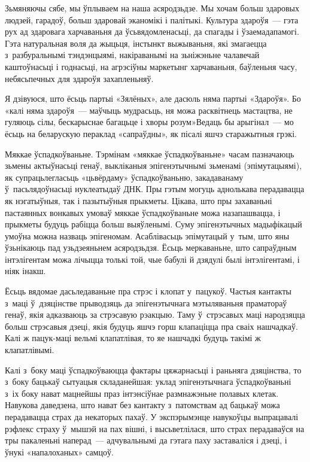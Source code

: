Зьмяняючы сябе, мы ўплываем на наша асяродзьдзе. Мы хочам больш здаровых людзей, гарадоў, больш здаровай эканомікі і палітыкі. Культура здароўя~--- гэта рух ад здаровага харчаваньня да ўсьвядомленасьці, да спагады і ўзаемадапамогі. Гэта натуральная воля да жыцьця, інстынкт выжываньня, які змагаецца з~разбуральнымі тэндэнцыямі, накіраванымі на зьніжэньне чалавечай каштоўнасьці і годнасьці, на агрэсіўны маркетынг харчаваньня, баўленьня часу, небясьпечных для здароўя захапленьняў.

Я дзівуюся, што ёсьць партыі «Зялёных», але дасюль няма партыі «Здароўя». Бо «калі няма здароўя~--- маўчыць мудрасьць, ня можа расквітнець мастацтва, не гуляюць сілы, бескарыснае багацьце і хворы розум»Ведаць бы арыгінал~--- мо ёсьць на беларускую пераклад «сапраўдны», як пісалі яшчэ старажытныя грэкі.

Мяккае ўспадкоўваньне. Тэрмінам «мяккае ўспадкоўваньне» часам пазначаюць зьмены актыўнасьці генаў, выкліканыя эпігенэтычнымі зьменамі (эпімутацыямі), як супрацьлегласьць «цьвёрдаму» ўспадкоўваньню, закадаванаму ў~пасьлядоўнасьці нуклеатыдаў ДНК. Пры гэтым могуць аднолькава перадавацца як нэгатыўныя, так і пазытыўныя прыкметы. Цікава, што пры захаваньні пастаянных вонкавых умоваў мяккае ўспадкоўваньне можа назапашвацца, і прыкметы будуць рабіцца больш выяўленымі. Суму эпігенэтычных мадыфікацый умоўна можна назваць эпігеномам. Асаблівасьць эпімутацый у~тым, што яны ўзьнікаюць пад узьдзеяньнем асяродзьдзя. Ёсьць меркаваньне, што сапраўдным інтэлігентам можа лічыцца толькі той, чые бабулі й дзядулі былі інтэлігентамі, і ніяк інакш.

Ёсьць вядомае дасьледаваньне пра стрэс і клопат у~пацукоў. Частыя кантакты з~маці ў~дзяцінстве прыводзяць да эпігенэтычнага мэтыляваньня праматораў генаў, якія адказваюць за стрэсавую рэакцыю. Таму ў~стрэсавых маці народзяцца больш стрэсавыя дзеці, якія будуць яшчэ горш клапаціцца пра сваіх нашчадкаў. Калі ж пацук-маці вельмі клапатлівая, то яе нашчадкі будуць такімі ж клапатлівымі.

Калі з~боку маці ўспадкоўваюцца фактары цяжарнасьці і раньняга дзяцінства, то з~боку бацькаў сытуацыя складанейшая: уклад эпігенэтычнага ўспадкоўваньні з~іх боку нават мацнейшы праз інтэнсіўнае размнажэньне полавых клетак. Навукова даведзена, што нават без кантакту з~патомствам ад бацькаў можа перадавацца страх да некаторых пахаў. У экспэрымэнце навукоўцы выпрацавалі рэфлекс страху ў~мышэй на пах вішні, і высьветлілася, што страх перадаваўся на тры пакаленьні наперад~--- адчувальнымі да гэтага паху заставаліся і дзеці, і ўнукі «напалоханых» самцоў.

